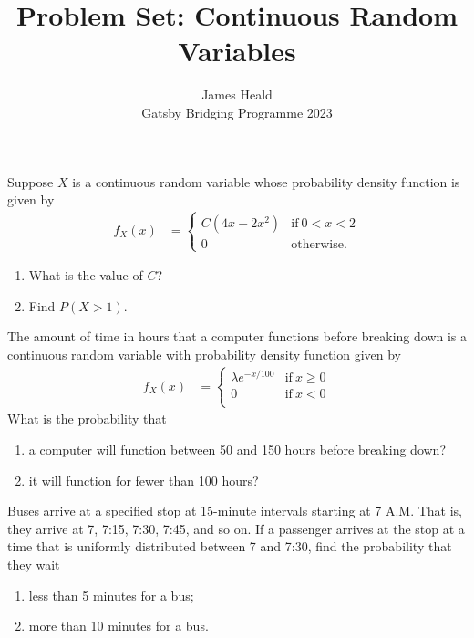 \documentclass[10pt]{article}
\newenvironment{problem}[2][Problem]{\begin{trivlist}
\item[\hskip \labelsep {\bfseries #1}\hskip \labelsep {\bfseries #2.}]}{\end{trivlist}}
\begin{document}
 
\title{Problem Set: Continuous Random Variables}
\author{James Heald\\
Gatsby Bridging Programme 2023}
\date{}
\maketitle

\begin{problem}{1}
Suppose $X$ is a continuous random variable whose probability density function is given by
\begin{align*}
    f_X(x) &= 
    \begin{cases}
      C(4x-2x^2) & \text{if}\ 0 < x < 2 \\
      0 & \text{otherwise.}
    \end{cases}
\end{align*}
\begin{enumerate}[label=(\alph*)]
\item What is the value of $C$? 
\item Find $P(X > 1)$.
\end{enumerate}
\end{problem}

\begin{problem}{2}
The amount of time in hours that a computer functions before breaking down is a
continuous random variable with probability density function given by
\begin{align*}
    f_X(x) &= 
    \begin{cases}
      \lambda e^{-x/100} & \text{if}\ x \geq 0 \\
      0 & \text{if}\ x < 0 \\
    \end{cases}
\end{align*}
What is the probability that
\begin{enumerate}[label=(\alph*)]
\item a computer will function between 50 and 150 hours before breaking down?
\item it will function for fewer than 100 hours?
\end{enumerate}
\end{problem}
 
\begin{problem}{3}
Buses arrive at a specified stop at 15-minute intervals starting at 7 A.M. That is, they
arrive at 7, 7:15, 7:30, 7:45, and so on. If a passenger arrives at the stop at a time that
is uniformly distributed between 7 and 7:30, find the probability that they wait
\begin{enumerate}[label=(\alph*)]
\item less than 5 minutes for a bus;
\item more than 10 minutes for a bus.
\end{enumerate}
\end{problem}
\end{document}
